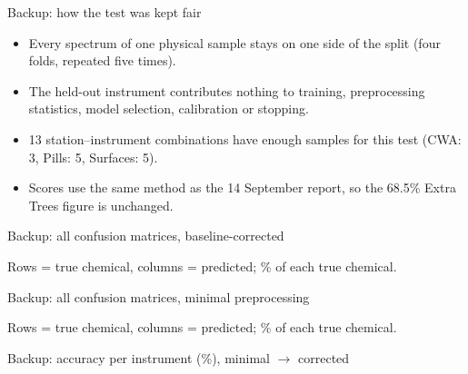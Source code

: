 \documentclass[aspectratio=169,10pt]{beamer}
\newcommand{\src}[1]{{\par\vspace{1pt}\tiny\color{cInk2}#1\par}}
\begin{document}
\begin{frame}{Backup: how the test was kept fair}
\centering
{}

\vspace{0.8em}
\begin{itemize}\small
  \item Every spectrum of one physical sample stays on one side of the split (four folds, repeated five times).
  \item The held-out instrument contributes nothing to training, preprocessing statistics, model selection, calibration or stopping.
  \item 13 station--instrument combinations have enough samples for this test (CWA: 3, Pills: 5, Surfaces: 5).
  \item Scores use the same method as the 14 September report, so the 68.5\% Extra Trees figure is unchanged.
\end{itemize}
\end{frame}

\begin{frame}{Backup: all confusion matrices, baseline-corrected}
\centering

\src{Rows = true chemical, columns = predicted; \% of each true chemical.}
\end{frame}

\begin{frame}{Backup: all confusion matrices, minimal preprocessing}
\centering

\src{Rows = true chemical, columns = predicted; \% of each true chemical.}
\end{frame}

\begin{frame}{Backup: accuracy per instrument (\%), minimal $\to$ corrected}
\centering\scriptsize

\end{frame}
\end{document}
